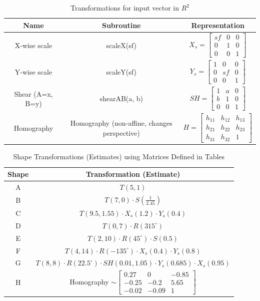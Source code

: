 \documentclass[10pt,a4paper]{article}
\begin{document}
\begin{table}[H]
\centering
\begin{tabular}{|c|c|c|}
\hline
\textbf{Name} & \textbf{Subroutine} & \textbf{Representation} \\
\hline
X-wise scale & scaleX(sf) & $X_s = \begin{bmatrix} sf & 0 & 0 \\ 0 & 1 & 0 \\ 0 & 0 & 1 \end{bmatrix}$ \\
Y-wise scale & scaleY(sf) & $Y_s = \begin{bmatrix} 1 & 0 & 0 \\ 0 & sf & 0 \\ 0 & 0 & 1 \end{bmatrix}$ \\
Shear (A=x, B=y) & shearAB(a, b) & $SH = \begin{bmatrix} 1 & a & 0 \\ b & 1 & 0 \\ 0 & 0 & 1 \end{bmatrix}$ \\
Homography & Homography (non-affine, changes perspective) & $H = \begin{bmatrix} h_{11} & h_{12} & h_{13} \\ h_{21} & h_{22} & h_{23} \\ h_{31} & h_{32} & 1 \end{bmatrix}$ \\
\hline
\end{tabular}
\caption{Transformations for input vector in $R^2$}
\end{table}

\begin{table}[H]
\centering
\begin{tabular}{|c|c|}
\hline
\textbf{Shape} & \textbf{Transformation (Estimate)} \\
\hline
A & $T(5,1)$ \\
\hline
B & $T(7,0) \cdot S\left(\frac{1}{2.45}\right)$ \\
\hline
C & $T(9.5,1.55) \cdot X_s(1.2) \cdot Y_s(0.4)$ \\
\hline
D & $T(0,7) \cdot R(315^\circ)$ \\
\hline
E & $T(2,10) \cdot R(45^\circ) \cdot S(0.5)$ \\
\hline
F & $T(4,14) \cdot R(-135^\circ) \cdot X_s(0.4) \cdot Y_s(0.8)$ \\
\hline
G & $T(8,8) \cdot R(22.5^\circ) \cdot SH(0.01, 1.05) \cdot Y_s(0.685) \cdot X_s(0.95)$ \\
\hline
H & Homography $\sim \begin{bmatrix} 0.27 & 0 & -0.85 \\ -0.25 & -0.2 & 5.65 \\ -0.02 & -0.09 & 1 \end{bmatrix}$ \\
\hline
\end{tabular}
\caption{Shape Transformations (Estimates) using Matrices Defined in Tables}
\end{table}
\end{document}
